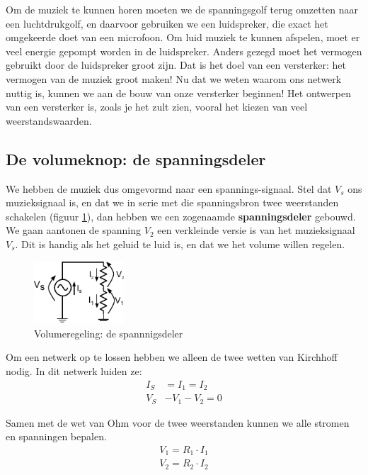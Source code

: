 \documentclass{article}
\begin{document}
			Om de muziek te kunnen horen moeten we de spanningsgolf terug omzetten naar een luchtdrukgolf, en daarvoor gebruiken we een luidspreker, die exact het omgekeerde doet van een microfoon. Om luid muziek te kunnen afspelen, moet er veel energie gepompt worden in de luidspreker. Anders gezegd moet het vermogen gebruikt door de luidspreker groot zijn. Dat is het  doel van een versterker: het vermogen van de muziek groot maken! Nu dat we weten waarom ons netwerk nuttig is, kunnen we aan de bouw van onze versterker beginnen! Het ontwerpen van een versterker is, zoals je het zult zien, vooral het kiezen van veel weerstandswaarden.

		\subsection{De volumeknop: de spanningsdeler}

			We hebben de muziek dus omgevormd naar een spannings-signaal. Stel dat $V_s$ ons muzieksignaal is, en dat we in serie met die spanningsbron twee weerstanden schakelen (figuur \ref{fig:volume}), dan hebben we een zogenaamde \textbf{spanningsdeler} gebouwd. We gaan aantonen de spanning $V_2$ een verkleinde versie is van het muzieksignaal $V_s$. Dit is handig als het geluid te luid is, en dat we het volume willen regelen.

			\begin{figure}[htbp]
				\centering
				\includegraphics[width=0.3\textwidth]{weerstandsdeler}
				\caption{Volumeregeling: de spannnigsdeler}
				\label{fig:volume}
			\end{figure}

			Om een netwerk op te lossen hebben we alleen de twee wetten van Kirchhoff nodig. In dit netwerk luiden ze:
			\begin{align}
			    I_S &= I_1 = I_2 \\
			    V_S &- V_1 -V_2 = 0 
			\end{align}

			Samen met de wet van Ohm voor de twee weerstanden kunnen we alle stromen en spanningen bepalen.
			\begin{align}
			    V_1 = R_1 \cdot I_1 \\
			    V_2 = R_2 \cdot I_2
			\end{align}
\end{document}
